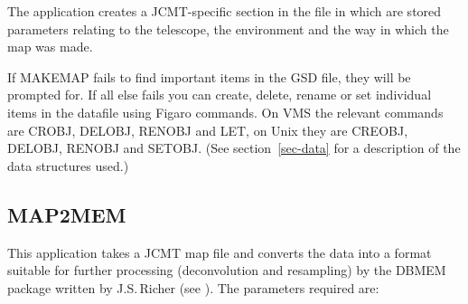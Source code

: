 \documentclass[twoside,11pt,nolof]{starlink}
\begin{document}
The application creates a JCMT-specific section in the file in which
are stored parameters relating to the telescope, the environment and
the way in which the map was made.

If MAKEMAP fails to find important items in the GSD file, they will be
prompted for. If all else fails you can create, delete, rename or set
individual items in the datafile using Figaro commands.
On VMS the relevant commands are CROBJ, DELOBJ, RENOBJ and LET, on Unix
they are CREOBJ, DELOBJ, RENOBJ and SETOBJ.
(See section~\ref{sec-data} for a description
of the data structures used.)


\goodbreak

\subsection {MAP2MEM}

This application takes a JCMT map file and converts the data into a format
suitable for further processing (deconvolution and resampling) by the DBMEM
package written by J.S.\,Richer (see \cite{dbmem}). The parameters required
are:

\goodbreak
\end{document}
